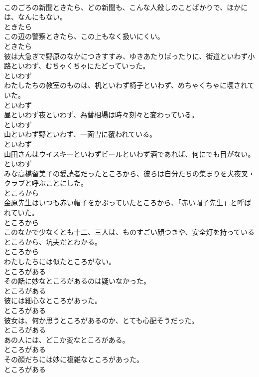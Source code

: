 \documentclass[8pt]{extreport}
\begin{document}
\begin{CJK}{UTF8}{min}
\\	このごろの新聞ときたら、どの新聞も、こんな人殺しのことばかりで、ほかには、なんにもない。	
\\	ときたら	
\\	この辺の警察ときたら、この上もなく扱いにくい。	
\\	ときたら	
\\	彼は大急ぎで野原のなかにつきすすみ、ゆきあたりばったりに、街道といわず小路といわず、むちゃくちゃにたどっていった。	
\\	といわず	
\\	わたしたちの教室のものは、机といわず椅子といわず、めちゃくちゃに壊されていた。	
\\	といわず	
\\	昼といわず夜といわず、為替相場は時々刻々と変わっている。	
\\	といわず	
\\	山といわず野といわず、一面雪に覆われている。	
\\	といわず	
\\	山田さんはウイスキーといわずビールといわず酒であれば、何にでも目がない。	
\\	といわず	
\\	みな高橋留美子の愛読者だったところから、彼らは自分たちの集まりを犬夜叉・クラブと呼ぶことにした。	
\\	ところから	
\\	金原先生はいつも赤い帽子をかぶっていたところから、「赤い帽子先生」と呼ばれていた。	
\\	ところから	
\\	このなかで少なくとも十二、三人は、ものすごい顔つきや、安全灯を持っているところから、坑夫だとわかる。	
\\	ところから	
\\	わたしたちには似たところがない。	
\\	ところがある	
\\	その話に妙なところがあるのは疑いなかった。	
\\	ところがある	
\\	彼には細心なところがあった。	
\\	ところがある	
\\	彼女は、何か思うところがあるのか、とても心配そうだった。	
\\	ところがある	
\\	あの人には、どこか変なところがある。	
\\	ところがある	
\\	その顔だちには妙に複雑なところがあった。	
\\	ところがある	

\end{CJK}
\end{document}
